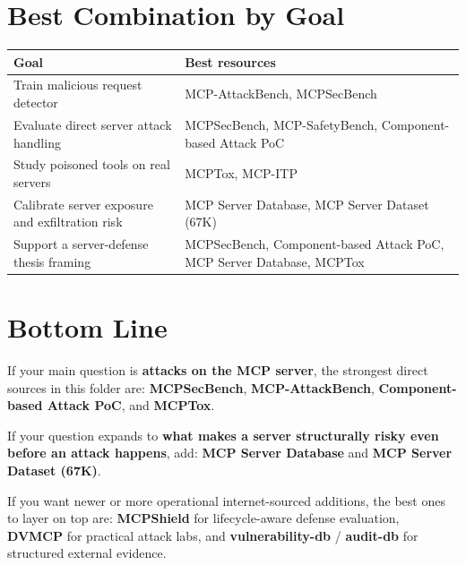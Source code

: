 \documentclass[11pt]{article}
\begin{document}
\section*{Best Combination by Goal}
\begin{longtable}{p{} p{}}
\toprule
\textbf{Goal} & \textbf{Best resources} \\
\midrule
Train malicious request detector & MCP-AttackBench, MCPSecBench \\
Evaluate direct server attack handling & MCPSecBench, MCP-SafetyBench, Component-based Attack PoC \\
Study poisoned tools on real servers & MCPTox, MCP-ITP \\
Calibrate server exposure and exfiltration risk & MCP Server Database, MCP Server Dataset (67K) \\
Support a server-defense thesis framing & MCPSecBench, Component-based Attack PoC, MCP Server Database, MCPTox \\
\bottomrule
\end{longtable}

\section*{Bottom Line}
If your main question is \textbf{attacks on the MCP server}, the strongest direct sources in this folder are:
\textbf{MCPSecBench}, \textbf{MCP-AttackBench}, \textbf{Component-based Attack PoC}, and \textbf{MCPTox}.

If your question expands to \textbf{what makes a server structurally risky even before an attack happens}, add:
\textbf{MCP Server Database} and \textbf{MCP Server Dataset (67K)}.

If you want newer or more operational internet-sourced additions, the best ones to layer on top are:
\textbf{MCPShield} for lifecycle-aware defense evaluation, \textbf{DVMCP} for practical attack labs, and
\textbf{vulnerability-db} / \textbf{audit-db} for structured external evidence.
\end{document}
